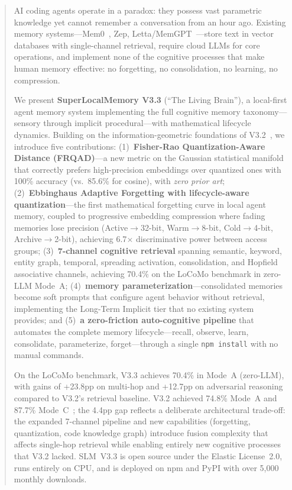 \begin{abstract}


AI coding agents operate in a paradox: they possess vast parametric knowledge yet cannot remember a conversation from an hour ago. Existing memory systems---Mem0~\cite{mem0}, Zep, Letta/MemGPT~\cite{letta}---store text in vector databases with single-channel retrieval, require cloud LLMs for core operations, and implement none of the cognitive processes that make human memory effective: no forgetting, no consolidation, no learning, no compression.

We present \textbf{SuperLocalMemory V3.3} (``The Living Brain''), a local-first agent memory system implementing the full cognitive memory taxonomy---sensory through implicit procedural---with mathematical lifecycle dynamics. Building on the information-geometric foundations of V3.2~\cite{slm-paper2}, we introduce five contributions:
(1)~\textbf{Fisher-Rao Quantization-Aware Distance (FRQAD)}---a new metric on the Gaussian statistical manifold that correctly prefers high-precision embeddings over quantized ones with 100\% accuracy (vs.\ 85.6\% for cosine), with \emph{zero prior art};
(2)~\textbf{Ebbinghaus Adaptive Forgetting with lifecycle-aware quantization}---the first mathematical forgetting curve in local agent memory, coupled to progressive embedding compression where fading memories lose precision (Active$\to$32-bit, Warm$\to$8-bit, Cold$\to$4-bit, Archive$\to$2-bit), achieving 6.7$\times$ discriminative power between access groups;
(3)~\textbf{7-channel cognitive retrieval} spanning semantic, keyword, entity graph, temporal, spreading activation, consolidation, and Hopfield associative channels, achieving 70.4\% on the LoCoMo benchmark in zero-LLM Mode~A;
(4)~\textbf{memory parameterization}---consolidated memories become soft prompts that configure agent behavior without retrieval, implementing the Long-Term Implicit tier that no existing system provides;
and (5)~\textbf{a zero-friction auto-cognitive pipeline} that automates the complete memory lifecycle---recall, observe, learn, consolidate, parameterize, forget---through a single \texttt{npm install} with no manual commands.

On the LoCoMo benchmark, V3.3 achieves 70.4\% in Mode~A (zero-LLM), with gains of +23.8pp on multi-hop and +12.7pp on adversarial reasoning compared to V3.2's retrieval baseline. V3.2 achieved 74.8\% Mode~A and 87.7\% Mode~C~\cite{slm-paper2}; the 4.4pp gap reflects a deliberate architectural trade-off: the expanded 7-channel pipeline and new capabilities (forgetting, quantization, code knowledge graph) introduce fusion complexity that affects single-hop retrieval while enabling entirely new cognitive processes that V3.2 lacked. SLM~V3.3 is open source under the Elastic License~2.0, runs entirely on CPU, and is deployed on npm and PyPI with over 5,000 monthly downloads.

\end{abstract}
